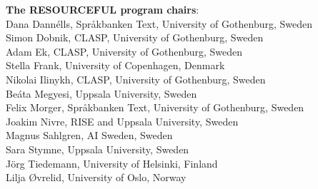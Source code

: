 \textbf{The RESOURCEFUL program chairs}: \\
Dana Dannélls, Språkbanken Text, University of Gothenburg, Sweden \\
Simon Dobnik, CLASP, University of Gothenburg, Sweden \\
Adam Ek, CLASP, University of Gothenburg, Sweden \\
Stella Frank, University of Copenhagen, Denmark \\
Nikolai Ilinykh, CLASP, University of Gothenburg, Sweden \\
Beáta Megyesi, Uppsala University, Sweden \\
Felix Morger, Språkbanken Text, University of Gothenburg, Sweden \\
Joakim Nivre, RISE and Uppsala University, Sweden \\ 
Magnus Sahlgren, AI Sweden, Sweden \\
Sara Stymne, Uppsala University, Sweden \\
Jörg Tiedemann, University of Helsinki, Finland \\
Lilja Øvrelid, University of Oslo, Norway \\

